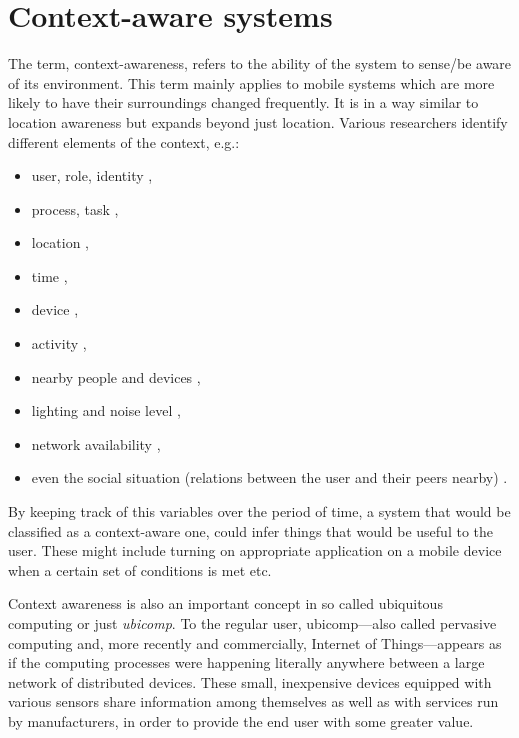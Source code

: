 \section{Context-aware systems}

The term, context-awareness, refers to the ability of the system to sense/be aware of its environment. This term mainly applies to mobile systems which are more likely to have their surroundings changed frequently. It is in a way similar to location awareness but expands beyond just location. Various researchers identify different elements of the context, e.g.:

\begin{itemize}
	\item user, role, identity \cite{Dey:context} \cite{Kaltz:context},
	\item process, task \cite{Kaltz:context},
	\item location \cite{Dey:context} \cite{Kaltz:context},
	\item time \cite{Dey:context} \cite{Kaltz:context},
	\item device \cite{Kaltz:context},
	\item activity \cite{Dey:context},
	\item nearby people and devices \cite{Rosslin:context},
	\item lighting and noise level \cite{Rosslin:context},
	\item network availability \cite{Rosslin:context},
	\item even the social situation (relations between the user and their peers nearby) \cite{Rosslin:context}.
\end{itemize}

By keeping track of this variables over the period of time, a system that would be classified as a context-aware one, could infer things that would be useful to the user. These might include turning on appropriate application on a mobile device when a certain set of conditions is met etc.

Context awareness is also an important concept in so called ubiquitous computing or just \emph{ubicomp}. To the regular user, ubicomp---also called pervasive computing and, more recently and commercially, Internet of Things---appears as if the computing processes were happening literally anywhere between a large network of distributed devices. These small, inexpensive devices equipped with various sensors share information among themselves as well as with services run by manufacturers, in order to provide the end user with some greater value.


